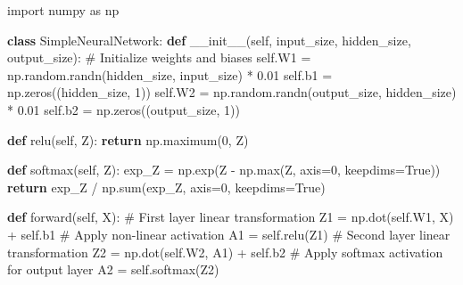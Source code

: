 \documentclass[
  letterpaper,
  DIV=11,
  numbers=noendperiod]{scrreprt}
\newenvironment{Shaded}{\begin{snugshade}}{\end{snugshade}}
\newcommand{\BuiltInTok}[1]{\textcolor[rgb]{0.00,0.23,0.31}{#1}}
\newcommand{\CommentTok}[1]{\textcolor[rgb]{0.37,0.37,0.37}{#1}}
\newcommand{\ControlFlowTok}[1]{\textcolor[rgb]{0.00,0.23,0.31}{\textbf{#1}}}
\newcommand{\DecValTok}[1]{\textcolor[rgb]{0.68,0.00,0.00}{#1}}
\newcommand{\FloatTok}[1]{\textcolor[rgb]{0.68,0.00,0.00}{#1}}
\newcommand{\FunctionTok}[1]{\textcolor[rgb]{0.28,0.35,0.67}{#1}}
\newcommand{\ImportTok}[1]{\textcolor[rgb]{0.00,0.46,0.62}{#1}}
\newcommand{\KeywordTok}[1]{\textcolor[rgb]{0.00,0.23,0.31}{\textbf{#1}}}
\newcommand{\NormalTok}[1]{\textcolor[rgb]{0.00,0.23,0.31}{#1}}
\newcommand{\OperatorTok}[1]{\textcolor[rgb]{0.37,0.37,0.37}{#1}}
\newcommand{\VariableTok}[1]{\textcolor[rgb]{0.07,0.07,0.07}{#1}}
\begin{document}
\begin{Shaded}
\begin{Highlighting}[]
\ImportTok{import}\NormalTok{ numpy }\ImportTok{as}\NormalTok{ np}

\KeywordTok{class}\NormalTok{ SimpleNeuralNetwork:}
    \KeywordTok{def} \FunctionTok{\_\_init\_\_}\NormalTok{(}\VariableTok{self}\NormalTok{, input\_size, hidden\_size, output\_size):}
        \CommentTok{\# Initialize weights and biases}
        \VariableTok{self}\NormalTok{.W1 }\OperatorTok{=}\NormalTok{ np.random.randn(hidden\_size, input\_size) }\OperatorTok{*} \FloatTok{0.01}
        \VariableTok{self}\NormalTok{.b1 }\OperatorTok{=}\NormalTok{ np.zeros((hidden\_size, }\DecValTok{1}\NormalTok{))}
        \VariableTok{self}\NormalTok{.W2 }\OperatorTok{=}\NormalTok{ np.random.randn(output\_size, hidden\_size) }\OperatorTok{*} \FloatTok{0.01}
        \VariableTok{self}\NormalTok{.b2 }\OperatorTok{=}\NormalTok{ np.zeros((output\_size, }\DecValTok{1}\NormalTok{))}
    
    \KeywordTok{def}\NormalTok{ relu(}\VariableTok{self}\NormalTok{, Z):}
        \ControlFlowTok{return}\NormalTok{ np.maximum(}\DecValTok{0}\NormalTok{, Z)}
    
    \KeywordTok{def}\NormalTok{ softmax(}\VariableTok{self}\NormalTok{, Z):}
\NormalTok{        exp\_Z }\OperatorTok{=}\NormalTok{ np.exp(Z }\OperatorTok{{-}}\NormalTok{ np.}\BuiltInTok{max}\NormalTok{(Z, axis}\OperatorTok{=}\DecValTok{0}\NormalTok{, keepdims}\OperatorTok{=}\VariableTok{True}\NormalTok{))}
        \ControlFlowTok{return}\NormalTok{ exp\_Z }\OperatorTok{/}\NormalTok{ np.}\BuiltInTok{sum}\NormalTok{(exp\_Z, axis}\OperatorTok{=}\DecValTok{0}\NormalTok{, keepdims}\OperatorTok{=}\VariableTok{True}\NormalTok{)}
    
    \KeywordTok{def}\NormalTok{ forward(}\VariableTok{self}\NormalTok{, X):}
        \CommentTok{\# First layer linear transformation}
\NormalTok{        Z1 }\OperatorTok{=}\NormalTok{ np.dot(}\VariableTok{self}\NormalTok{.W1, X) }\OperatorTok{+} \VariableTok{self}\NormalTok{.b1}
        \CommentTok{\# Apply non{-}linear activation}
\NormalTok{        A1 }\OperatorTok{=} \VariableTok{self}\NormalTok{.relu(Z1)}
        \CommentTok{\# Second layer linear transformation}
\NormalTok{        Z2 }\OperatorTok{=}\NormalTok{ np.dot(}\VariableTok{self}\NormalTok{.W2, A1) }\OperatorTok{+} \VariableTok{self}\NormalTok{.b2}
        \CommentTok{\# Apply softmax activation for output layer}
\NormalTok{        A2 }\OperatorTok{=} \VariableTok{self}\NormalTok{.softmax(Z2)}
        

\end{Highlighting}
\end{Shaded}
\end{document}
